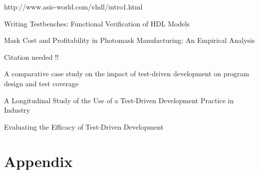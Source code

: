 \documentclass[11pt,british]{article}
\newcommand\blankpage{%
    \null
    \thispagestyle{empty}%
    \addtocounter{page}{-1}%
    \newpage}
\begin{document}
\pagebreak{}
\begin{thebibliography}{1}
http://www.asic-world.com/vhdl/intro1.html

Writing Testbenches: Functional Verification of HDL
Models

Mask Cost and Profitability in Photomask Manufacturing:
An Empirical Analysis

Citation needed !!

A comparative case study on the impact of test-driven
development on program design and test coverage

A Longitudinal Study of the Use of a Test-Driven Development
Practice in Industry

Evaluating the Efficacy of Test-Driven Development\end{thebibliography}


\newpage{}
\part{Appendix}


\afterpage{\blankpage}
\end{document}
